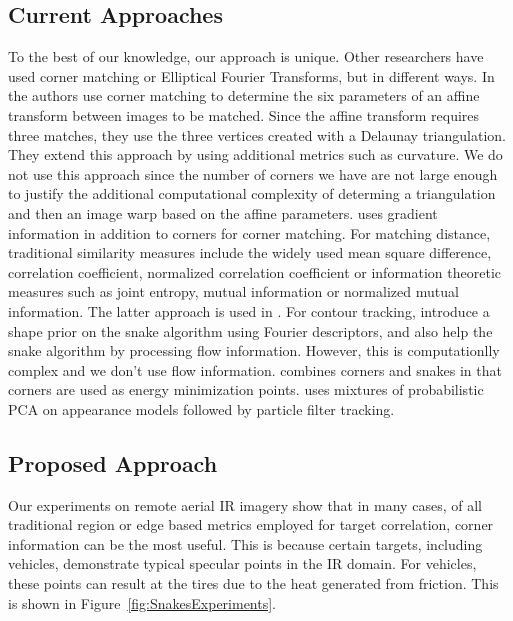 \documentclass{article}
\begin{document}
\subsection{Current Approaches}
To the best of our knowledge, our approach is unique.  Other researchers have used corner matching or Elliptical Fourier Transforms, but in different ways.  In \cite{2007_CNF_CornerMatching_Awrangjeb} the authors use corner matching to determine the six parameters of an affine transform between images to be matched.  Since the affine transform requires three matches, they use the three vertices created with a Delaunay triangulation.  They extend this approach by using additional metrics such as curvature.  We do not use this approach since the number of corners we have are not large enough to justify the additional computational complexity of determing a triangulation and then an image warp based on the affine parameters.  \cite{2008_CNF_CornerMatching_Yu} uses gradient information in addition to corners for corner matching.  For matching distance, traditional similarity measures include the widely used mean square difference, correlation coefficient, normalized correlation coefficient or information theoretic measures such as joint entropy, mutual information or normalized mutual information.    The latter approach is used in \cite{2004_CNF_GraphCornerMatching_Lourakis}.  For contour tracking, \cite{2006_CNF_FourierSnakes_Derrode} introduce a shape prior on the snake algorithm using Fourier descriptors, and \cite{2001_CNF_SnakeTracking_Kim} also help the snake algorithm by processing flow information.  However, this is computationlly complex and we don't use flow information.  \cite{2001_CNF_SnakeTracking_Kim} combines corners and snakes in that corners are used as energy minimization points.  \cite{2006_CNF_IRtracking_Mei} uses mixtures of probabilistic PCA on appearance models followed by particle filter tracking.
		
\subsection{Proposed Approach}
Our experiments on remote aerial IR imagery show that in many cases, of all traditional region or edge based metrics employed for target correlation, corner information can be the most useful.  This is because certain targets, including vehicles, demonstrate typical specular points in the IR domain.  For vehicles, these points can result at the tires due to the heat generated from friction.  This is shown in Figure~\ref{fig:SnakesExperiments}. 
\end{document}
